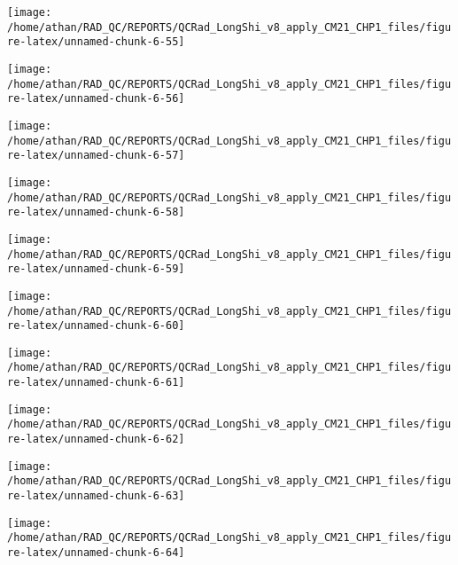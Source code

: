 \documentclass[
  10pt,
  a4paper,oneside]{article}
\begin{document}
\begin{center}\texttt{[image: /home/athan/RAD\_QC/REPORTS/QCRad\_LongShi\_v8\_apply\_CM21\_CHP1\_files/figure-latex/unnamed-chunk-6-55]} \end{center}

\begin{center}\texttt{[image: /home/athan/RAD\_QC/REPORTS/QCRad\_LongShi\_v8\_apply\_CM21\_CHP1\_files/figure-latex/unnamed-chunk-6-56]} \end{center}

\begin{center}\texttt{[image: /home/athan/RAD\_QC/REPORTS/QCRad\_LongShi\_v8\_apply\_CM21\_CHP1\_files/figure-latex/unnamed-chunk-6-57]} \end{center}

\begin{center}\texttt{[image: /home/athan/RAD\_QC/REPORTS/QCRad\_LongShi\_v8\_apply\_CM21\_CHP1\_files/figure-latex/unnamed-chunk-6-58]} \end{center}

\begin{center}\texttt{[image: /home/athan/RAD\_QC/REPORTS/QCRad\_LongShi\_v8\_apply\_CM21\_CHP1\_files/figure-latex/unnamed-chunk-6-59]} \end{center}

\begin{center}\texttt{[image: /home/athan/RAD\_QC/REPORTS/QCRad\_LongShi\_v8\_apply\_CM21\_CHP1\_files/figure-latex/unnamed-chunk-6-60]} \end{center}

\begin{center}\texttt{[image: /home/athan/RAD\_QC/REPORTS/QCRad\_LongShi\_v8\_apply\_CM21\_CHP1\_files/figure-latex/unnamed-chunk-6-61]} \end{center}

\begin{center}\texttt{[image: /home/athan/RAD\_QC/REPORTS/QCRad\_LongShi\_v8\_apply\_CM21\_CHP1\_files/figure-latex/unnamed-chunk-6-62]} \end{center}

\begin{center}\texttt{[image: /home/athan/RAD\_QC/REPORTS/QCRad\_LongShi\_v8\_apply\_CM21\_CHP1\_files/figure-latex/unnamed-chunk-6-63]} \end{center}

\begin{center}\texttt{[image: /home/athan/RAD\_QC/REPORTS/QCRad\_LongShi\_v8\_apply\_CM21\_CHP1\_files/figure-latex/unnamed-chunk-6-64]} \end{center}
\end{document}
